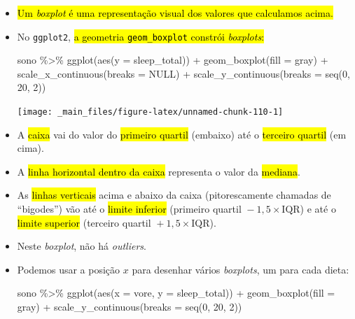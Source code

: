 \documentclass[
  11pt]{report}
\newenvironment{Shaded}{\begin{snugshade}}{\end{snugshade}}
\newcommand{\AttributeTok}[1]{\textcolor[rgb]{0.77,0.63,0.00}{#1}}
\newcommand{\ConstantTok}[1]{\textcolor[rgb]{0.00,0.00,0.00}{#1}}
\newcommand{\DecValTok}[1]{\textcolor[rgb]{0.00,0.00,0.81}{#1}}
\newcommand{\FunctionTok}[1]{\textcolor[rgb]{0.00,0.00,0.00}{#1}}
\newcommand{\NormalTok}[1]{#1}
\newcommand{\SpecialCharTok}[1]{\textcolor[rgb]{0.00,0.00,0.00}{#1}}
\newcommand{\StringTok}[1]{\textcolor[rgb]{0.31,0.60,0.02}{#1}}
\renewenvironment{Shaded}{
    \begin{mdframed}[%
      roundcorner=2pt,%
      innerleftmargin=5pt,%
      innerrightmargin=5pt,%
      topline=true,%
      leftline=true,%
      rightline=true,%
      bottomline=true,%
      linewidth=0.5pt,%
      linecolor=black!20,%
      backgroundcolor=black!2,%
      skipabove=2ex,%
      skipbelow=2.5ex%
    ]%
  }
  {
    \end{mdframed}
  }
\begin{document}
\begin{itemize}
\item
  {\hl{Um \emph{boxplot} é uma representação visual dos valores que calculamos acima.}}
\item
  No \texttt{ggplot2}, {\hl{a geometria {\mbox{\texttt{geom\_boxplot}}} constrói \emph{boxplots}:}}

\begin{Shaded}
\begin{Highlighting}[]
\NormalTok{sono }\SpecialCharTok{\%\textgreater{}\%} 
  \FunctionTok{ggplot}\NormalTok{(}\FunctionTok{aes}\NormalTok{(}\AttributeTok{y =}\NormalTok{ sleep\_total)) }\SpecialCharTok{+}
    \FunctionTok{geom\_boxplot}\NormalTok{(}\AttributeTok{fill =} \StringTok{\textquotesingle{}gray\textquotesingle{}}\NormalTok{) }\SpecialCharTok{+}
    \FunctionTok{scale\_x\_continuous}\NormalTok{(}\AttributeTok{breaks =} \ConstantTok{NULL}\NormalTok{) }\SpecialCharTok{+}
    \FunctionTok{scale\_y\_continuous}\NormalTok{(}\AttributeTok{breaks =} \FunctionTok{seq}\NormalTok{(}\DecValTok{0}\NormalTok{, }\DecValTok{20}\NormalTok{, }\DecValTok{2}\NormalTok{))}
\end{Highlighting}
\end{Shaded}

  \begin{center}\texttt{[image: \_main\_files/figure-latex/unnamed-chunk-110-1]} \end{center}
\item
  A {\hl{caixa}} vai do valor do {\hl{primeiro quartil}} (embaixo) até o {\hl{terceiro quartil}} (em cima).
\item
  A {\hl{linha horizontal dentro da caixa}} representa o valor da {\hl{mediana}}.
\item
  As {\hl{linhas verticais}} acima e abaixo da caixa (pitorescamente chamadas de ``bigodes'') vão até o {\hl{limite inferior}} (primeiro quartil ${}- 1{,}5 \times \text{IQR}$) e até o {\hl{limite superior}} (terceiro quartil ${}+ 1{,}5 \times \text{IQR}$).
\item
  Neste \emph{boxplot}, não há \emph{outliers}.
\item
  \protect\hypertarget{onivoros}{}{} Podemos usar a posição $x$ para desenhar vários \emph{boxplots}, um para cada dieta:

\begin{Shaded}
\begin{Highlighting}[]
\NormalTok{sono }\SpecialCharTok{\%\textgreater{}\%} 
  \FunctionTok{ggplot}\NormalTok{(}\FunctionTok{aes}\NormalTok{(}\AttributeTok{x =}\NormalTok{ vore, }\AttributeTok{y =}\NormalTok{ sleep\_total)) }\SpecialCharTok{+}
    \FunctionTok{geom\_boxplot}\NormalTok{(}\AttributeTok{fill =} \StringTok{\textquotesingle{}gray\textquotesingle{}}\NormalTok{) }\SpecialCharTok{+}
    \FunctionTok{scale\_y\_continuous}\NormalTok{(}\AttributeTok{breaks =} \FunctionTok{seq}\NormalTok{(}\DecValTok{0}\NormalTok{, }\DecValTok{20}\NormalTok{, }\DecValTok{2}\NormalTok{))}
\end{Highlighting}
\end{Shaded}


\end{itemize}
\end{document}
